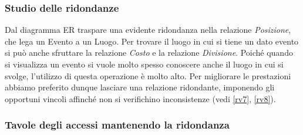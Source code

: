 \documentclass[a4paper,11pt]{article}
\begin{document}
\subsubsection*{Studio delle ridondanze}

Dal diagramma ER traspare una evidente ridondanza nella relazione \emph{Posizione}, che lega un Evento a un Luogo.
Per trovare il luogo in cui si tiene un dato evento si può anche sfruttare la relazione \emph{Costo} e la relazione \emph{Divisione}.
Poiché quando si visualizza un evento si vuole molto spesso conoscere anche il luogo in cui si svolge, l'utilizzo di questa operazione è molto alto.
Per migliorare le prestazioni abbiamo preferito dunque lasciare una relazione ridondante, imponendo gli opportuni vincoli affinché non si verifichino inconsistenze (vedi \ref{rv7}, \ref{rv8}).

\subsubsection*{Tavole degli accessi mantenendo la ridondanza}
\end{document}
